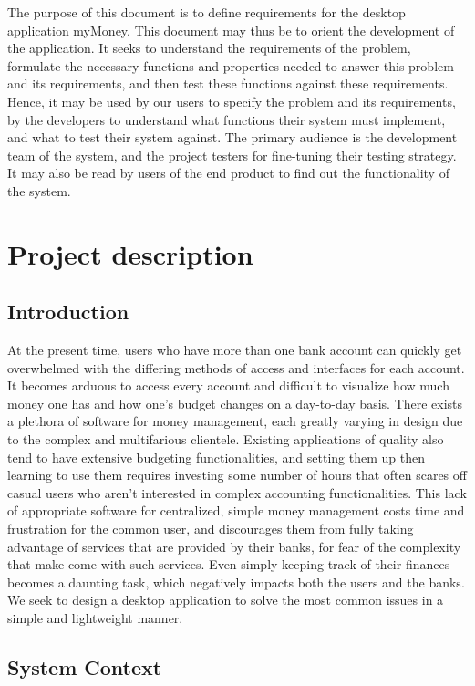 \documentclass[11pt]{article}
\newcounter{use case ID}
\newcounter{req ID}
\begin{document}
The purpose of this document is to define requirements for the  desktop application myMoney. This document may thus be to orient the development of the application. It seeks to understand the requirements of the problem, formulate the necessary functions and properties needed to answer this problem and its requirements, and then test these functions against these requirements. Hence, it may be used by our users to specify the problem and its requirements, by the developers to understand what functions their system must implement, and what to test their system against. The primary audience is the development team of the system, and the project testers for fine-tuning their testing strategy. It may also be read by users of the end product to find out the functionality of the system.

\section{Project description}

\subsection{Introduction}
At the present time, users who have more than one bank account can quickly get overwhelmed with the differing methods of access and interfaces for each account. It becomes arduous to access every account and difficult to visualize how much money one has and how one's budget changes on a day-to-day basis. There exists a plethora of software for money management, each greatly varying in design due to the complex and multifarious clientele. Existing applications of quality also tend to have extensive budgeting functionalities, and setting them up then learning to use them requires investing some number of hours that often scares off casual users who aren't interested in complex accounting functionalities. This lack of appropriate software for centralized, simple money management costs time and frustration for the common user, and discourages them from fully taking advantage of services that are provided by their banks, for fear of the complexity that make come with such services. Even simply keeping track of their finances becomes a daunting task, which negatively impacts both the users and the banks. We seek to design a desktop application to solve the most common issues in a simple and lightweight manner.

\subsection{System Context}
\end{document}
